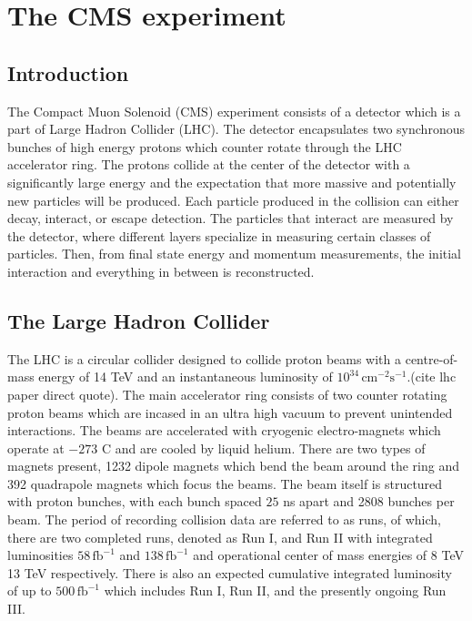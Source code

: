 \setcounter{secnumdepth}{3}
\setcounter{tocdepth}{3}
\setlength{\parskip}{\smallskipamount}
\setlength{\parindent}{0pt}


\makeatletter


\providecommand{\tabularnewline}{\\}


\makeatother


\chapter{The CMS experiment}

\section{Introduction} The Compact Muon Solenoid (CMS) experiment consists of a detector which is a part of Large Hadron Collider (LHC). The detector encapsulates two synchronous bunches of high energy protons  which counter rotate through the LHC accelerator ring.  The protons collide at the center of the detector with a significantly large energy and the expectation that more massive and potentially new particles will be produced. Each particle produced in the collision can either decay, interact, or escape detection. The particles that interact are measured by the detector, where different layers specialize in measuring certain classes of particles. Then, from final state energy and momentum measurements, the initial interaction and everything in between is reconstructed.   



\section{The Large Hadron Collider}
The LHC is a circular collider designed to collide proton beams with a centre-of-mass energy of 14 TeV and an instantaneous luminosity of $10^{34} \, \text{cm}^{-2}\text{s}^{-1}$.(cite lhc paper direct quote). The main accelerator ring consists of two counter rotating proton beams which are incased in an ultra high vacuum to prevent unintended interactions. The beams are accelerated with cryogenic electro-magnets which operate at $-273$ C and are cooled by liquid helium. There are two types of magnets present, 1232 dipole magnets which bend the beam around the ring and 392 quadrapole magnets which focus the beams.  The beam itself is structured with proton bunches, with each bunch spaced $25$ ns apart and 2808 bunches per beam. The period of recording collision data are referred to as runs, of which, there are two completed runs, denoted as Run I, and Run II with integrated luminosities $58 \, \text{fb}^{-1}$ and $138\, \text{fb}^{-1}$ and operational center of mass energies of 8 TeV 13 TeV respectively. There is also an expected cumulative integrated luminosity of up to $500 \,\text{fb}^{-1}$ which includes Run I, Run II, and the presently ongoing Run III.  


